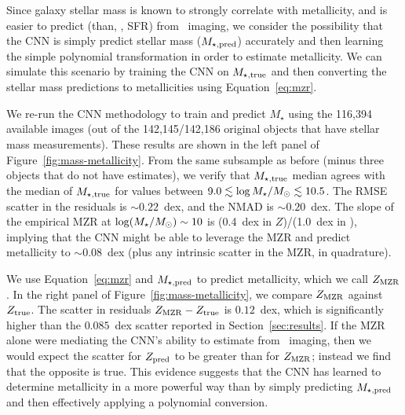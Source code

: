 \documentclass[fleqn,usenatbib]{mnras}
\begin{document}
Since galaxy stellar mass is known to strongly correlate with metallicity, and is easier to predict (than, \eg, SFR) from \sdssg\sdssr\sdssi\ imaging, we consider the possibility that the CNN is simply predict stellar mass ($M_{\star,\rm pred}$) accurately and then learning the simple polynomial transformation in order to estimate metallicity. We can simulate this scenario by training the CNN on $M_{\star, \rm true}$ and then converting the stellar mass predictions to metallicities using Equation~\ref{eq:mzr}.

We re-run the CNN methodology to train and predict $M_{\star}$ using the 116,394 available images (out of the 142,145/142,186 original objects that have stellar mass measurements). These results are shown in the left panel of Figure~\ref{fig:mass-metallicity}. From the same subsample as before (minus three objects that do not have \mstar estimates), we verify that $M_{\rm \star, true}$ median agrees with the median of $M_{\rm \star, true}$ for values between $9.0 \lesssim \log \hbox{$M_{\star}$} /\hbox{$M_\odot$} \lesssim 10.5$. The RMSE scatter in the \mstar{} residuals is $\sim 0.22$~dex, and the NMAD is $\sim 0.20$~dex. The slope of the empirical MZR at $\log (\hbox{$M_{\star}$} / \hbox{$M_\odot$}) \sim 10$ is (0.4~dex in $Z$)/(1.0~dex in \mstar), implying that the CNN might be able to leverage the MZR and predict metallicity to $\sim 0.08$~dex (plus any intrinsic scatter in the MZR, in quadrature).

We use Equation~\ref{eq:mzr} and $M_{\star,\rm pred}$ to predict metallicity, which we call $Z_{\rm MZR}$. In the right panel of Figure~\ref{fig:mass-metallicity}, we compare $Z_{\rm MZR}$ against $Z_{\rm true}$. The scatter in residuals $Z_{\rm MZR} - Z_{\rm true}$ is $0.12$~dex, which is significantly higher than the $0.085$~dex scatter reported in Section~\ref{sec:results}. If the MZR alone were mediating the CNN's ability to estimate from
\sdssg\sdssr\sdssi\ imaging, then we would expect the scatter for $Z_{\rm pred}$ to be greater than for $Z_{\rm MZR}$; instead we find that the opposite is true. This evidence suggests that the CNN has learned to determine metallicity in a more powerful way than by simply predicting $M_{\rm \star,pred}$ and then effectively applying a polynomial conversion.
\end{document}
